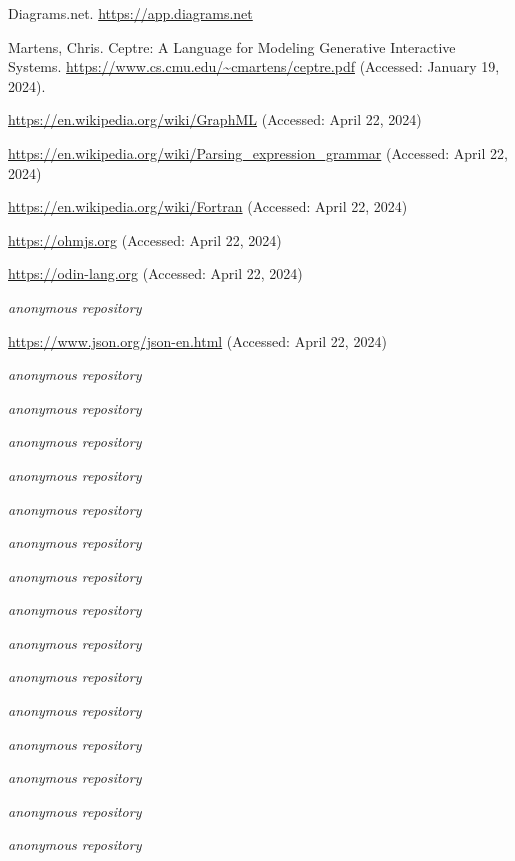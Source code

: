 \documentclass[10pt,anonymous,review]{acmart}
\begin{document}
\begin{thebibliography}{9}

Diagrams.net.
\url{https://app.diagrams.net}

Martens, Chris. Ceptre: A Language for Modeling Generative Interactive Systems. \url{https://www.cs.cmu.edu/~cmartens/ceptre.pdf} (Accessed: January 19, 2024).

\url{https://en.wikipedia.org/wiki/GraphML} (Accessed: April 22, 2024)

\url{https://en.wikipedia.org/wiki/Parsing_expression_grammar} (Accessed: April 22, 2024)

\url{https://en.wikipedia.org/wiki/Fortran} (Accessed: April 22, 2024)

\url{https://ohmjs.org} (Accessed: April 22, 2024)

\url{https://odin-lang.org} (Accessed: April 22, 2024)

\emph{anonymous repository}

\url{https://www.json.org/json-en.html} (Accessed: April 22, 2024)

\emph{anonymous repository}

\emph{anonymous repository}

\emph{anonymous repository}

\emph{anonymous repository}

\emph{anonymous repository}

\emph{anonymous repository}

\emph{anonymous repository}

\emph{anonymous repository}

\emph{anonymous repository}

\emph{anonymous repository}

\emph{anonymous repository}

\emph{anonymous repository}

\emph{anonymous repository}

\emph{anonymous repository}

\emph{anonymous repository}

\end{thebibliography}
\end{document}
